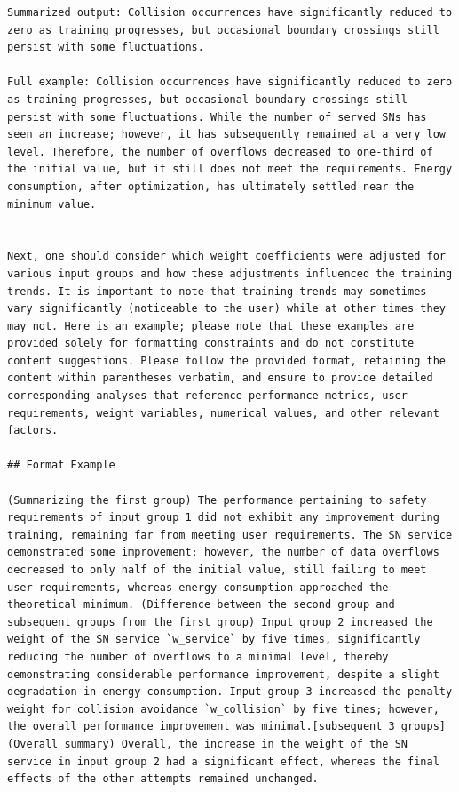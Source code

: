 \documentclass{article}
\begin{document}
\begin{verbatim}
Summarized output: Collision occurrences have significantly reduced to zero as training progresses, but occasional boundary crossings still persist with some fluctuations.

Full example: Collision occurrences have significantly reduced to zero as training progresses, but occasional boundary crossings still persist with some fluctuations. While the number of served SNs has seen an increase; however, it has subsequently remained at a very low level. Therefore, the number of overflows decreased to one-third of the initial value, but it still does not meet the requirements. Energy consumption, after optimization, has ultimately settled near the minimum value.


Next, one should consider which weight coefficients were adjusted for various input groups and how these adjustments influenced the training trends. It is important to note that training trends may sometimes vary significantly (noticeable to the user) while at other times they may not. Here is an example; please note that these examples are provided solely for formatting constraints and do not constitute content suggestions. Please follow the provided format, retaining the content within parentheses verbatim, and ensure to provide detailed corresponding analyses that reference performance metrics, user requirements, weight variables, numerical values, and other relevant factors.

## Format Example

(Summarizing the first group) The performance pertaining to safety requirements of input group 1 did not exhibit any improvement during training, remaining far from meeting user requirements. The SN service demonstrated some improvement; however, the number of data overflows decreased to only half of the initial value, still failing to meet user requirements, whereas energy consumption approached the theoretical minimum. (Difference between the second group and subsequent groups from the first group) Input group 2 increased the weight of the SN service `w_service` by five times, significantly reducing the number of overflows to a minimal level, thereby demonstrating considerable performance improvement, despite a slight degradation in energy consumption. Input group 3 increased the penalty weight for collision avoidance `w_collision` by five times; however, the overall performance improvement was minimal.[subsequent 3 groups] (Overall summary) Overall, the increase in the weight of the SN service in input group 2 had a significant effect, whereas the final effects of the other attempts remained unchanged.


\end{verbatim}
\end{document}

